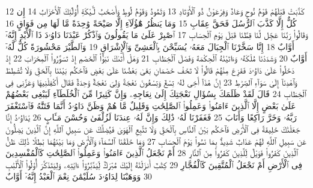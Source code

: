 {\tiny\colorbox{cl_aya}{12}} كَذَّبَتْ قَبْلَهُمْ قَوْمُ نُوحٍ وَعَادٌ وَفِرْعَوْنُ ذُو ٱلْأَوْتَادِ
{\tiny\colorbox{cl_aya}{13}} وَثَمُودُ وَقَوْمُ لُوطٍ وَأَصْحَٰبُ لْـَٔيْكَةِ أُو۟لَٰٓئِكَ ٱلْأَحْزَابُ
{\tiny\colorbox{cl_aya}{14}} إِن كُلٌّ إِلَّا كَذَّبَ ٱلرُّسُلَ فَحَقَّ عِقَابِ
{\tiny\colorbox{cl_aya}{15}} وَمَا يَنظُرُ هَٰٓؤُلَآءِ إِلَّا صَيْحَةً وَٰحِدَةً مَّا لَهَا مِن فَوَاقٍ
{\tiny\colorbox{cl_aya}{16}} وَقَالُوا۟ رَبَّنَا عَجِّل لَّنَا قِطَّنَا قَبْلَ يَوْمِ ٱلْحِسَابِ
{\tiny\colorbox{cl_aya}{17}} ٱصْبِرْ عَلَىٰ مَا يَقُولُونَ وَٱذْكُرْ عَبْدَنَا دَاوُۥدَ ذَا ٱلْأَيْدِ إِنَّهُۥٓ أَوَّابٌ
{\tiny\colorbox{cl_aya}{18}} إِنَّا سَخَّرْنَا ٱلْجِبَالَ مَعَهُۥ يُسَبِّحْنَ بِٱلْعَشِىِّ وَٱلْإِشْرَاقِ
{\tiny\colorbox{cl_aya}{19}} وَٱلطَّيْرَ مَحْشُورَةً كُلٌّ لَّهُۥٓ أَوَّابٌ
{\tiny\colorbox{cl_aya}{20}} وَشَدَدْنَا مُلْكَهُۥ وَءَاتَيْنَٰهُ ٱلْحِكْمَةَ وَفَصْلَ ٱلْخِطَابِ
{\tiny\colorbox{cl_aya}{21}} وَهَلْ أَتَىٰكَ نَبَؤُا۟ ٱلْخَصْمِ إِذْ تَسَوَّرُوا۟ ٱلْمِحْرَابَ
{\tiny\colorbox{cl_aya}{22}} إِذْ دَخَلُوا۟ عَلَىٰ دَاوُۥدَ فَفَزِعَ مِنْهُمْ قَالُوا۟ لَا تَخَفْ خَصْمَانِ بَغَىٰ بَعْضُنَا عَلَىٰ بَعْضٍ فَٱحْكُم بَيْنَنَا بِٱلْحَقِّ وَلَا تُشْطِطْ وَٱهْدِنَآ إِلَىٰ سَوَآءِ ٱلصِّرَٰطِ
{\tiny\colorbox{cl_aya}{23}} إِنَّ هَٰذَآ أَخِى لَهُۥ تِسْعٌ وَتِسْعُونَ نَعْجَةً وَلِىَ نَعْجَةٌ وَٰحِدَةٌ فَقَالَ أَكْفِلْنِيهَا وَعَزَّنِى فِى ٱلْخِطَابِ
{\tiny\colorbox{cl_aya}{24}} قَالَ لَقَدْ ظَلَمَكَ بِسُؤَالِ نَعْجَتِكَ إِلَىٰ نِعَاجِهِۦ وَإِنَّ كَثِيرًا مِّنَ ٱلْخُلَطَآءِ لَيَبْغِى بَعْضُهُمْ عَلَىٰ بَعْضٍ إِلَّا ٱلَّذِينَ ءَامَنُوا۟ وَعَمِلُوا۟ ٱلصَّٰلِحَٰتِ وَقَلِيلٌ مَّا هُمْ وَظَنَّ دَاوُۥدُ أَنَّمَا فَتَنَّٰهُ فَٱسْتَغْفَرَ رَبَّهُۥ وَخَرَّ رَاكِعًا وَأَنَابَ
{\tiny\colorbox{cl_aya}{25}} فَغَفَرْنَا لَهُۥ ذَٰلِكَ وَإِنَّ لَهُۥ عِندَنَا لَزُلْفَىٰ وَحُسْنَ مَـَٔابٍ
{\tiny\colorbox{cl_aya}{26}} يَٰدَاوُۥدُ إِنَّا جَعَلْنَٰكَ خَلِيفَةً فِى ٱلْأَرْضِ فَٱحْكُم بَيْنَ ٱلنَّاسِ بِٱلْحَقِّ وَلَا تَتَّبِعِ ٱلْهَوَىٰ فَيُضِلَّكَ عَن سَبِيلِ ٱللَّهِ إِنَّ ٱلَّذِينَ يَضِلُّونَ عَن سَبِيلِ ٱللَّهِ لَهُمْ عَذَابٌ شَدِيدٌۢ بِمَا نَسُوا۟ يَوْمَ ٱلْحِسَابِ
{\tiny\colorbox{cl_aya}{27}} وَمَا خَلَقْنَا ٱلسَّمَآءَ وَٱلْأَرْضَ وَمَا بَيْنَهُمَا بَٰطِلًا ذَٰلِكَ ظَنُّ ٱلَّذِينَ كَفَرُوا۟ فَوَيْلٌ لِّلَّذِينَ كَفَرُوا۟ مِنَ ٱلنَّارِ
{\tiny\colorbox{cl_aya}{28}} أَمْ نَجْعَلُ ٱلَّذِينَ ءَامَنُوا۟ وَعَمِلُوا۟ ٱلصَّٰلِحَٰتِ كَٱلْمُفْسِدِينَ فِى ٱلْأَرْضِ أَمْ نَجْعَلُ ٱلْمُتَّقِينَ كَٱلْفُجَّارِ
{\tiny\colorbox{cl_aya}{29}} كِتَٰبٌ أَنزَلْنَٰهُ إِلَيْكَ مُبَٰرَكٌ لِّيَدَّبَّرُوٓا۟ ءَايَٰتِهِۦ وَلِيَتَذَكَّرَ أُو۟لُوا۟ ٱلْأَلْبَٰبِ
{\tiny\colorbox{cl_aya}{30}} وَوَهَبْنَا لِدَاوُۥدَ سُلَيْمَٰنَ نِعْمَ ٱلْعَبْدُ إِنَّهُۥٓ أَوَّابٌ
